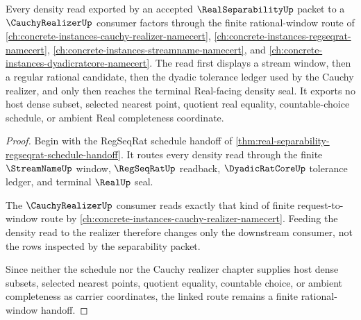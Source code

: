 \begin{theorem}
\label{thm:real-separability-cauchy-realizer-link}
Every density read exported by an accepted $\RealSeparabilityUp$ packet to a $\CauchyRealizerUp$ consumer factors through the finite rational-window route of \autoref{ch:concrete-instances-cauchy-realizer-namecert}, \autoref{ch:concrete-instances-regseqrat-namecert}, \autoref{ch:concrete-instances-streamname-namecert}, and \autoref{ch:concrete-instances-dyadicratcore-namecert}. The read first displays a stream window, then a regular rational candidate, then the dyadic tolerance ledger used by the Cauchy realizer, and only then reaches the terminal Real-facing density seal. It exports no host dense subset, selected nearest point, quotient real equality, countable-choice schedule, or ambient Real completeness coordinate.
\end{theorem}
\begin{proof}
Begin with the RegSeqRat schedule handoff of \autoref{thm:real-separability-regseqrat-schedule-handoff}. It routes every density read through the finite $\StreamNameUp$ window, $\RegSeqRatUp$ readback, $\DyadicRatCoreUp$ tolerance ledger, and terminal $\RealUp$ seal.

The $\CauchyRealizerUp$ consumer reads exactly that kind of finite request-to-window route by \autoref{ch:concrete-instances-cauchy-realizer-namecert}. Feeding the density read to the realizer therefore changes only the downstream consumer, not the rows inspected by the separability packet.

Since neither the schedule nor the Cauchy realizer chapter supplies host dense subsets, selected nearest points, quotient equality, countable choice, or ambient completeness as carrier coordinates, the linked route remains a finite rational-window handoff.
\end{proof}
